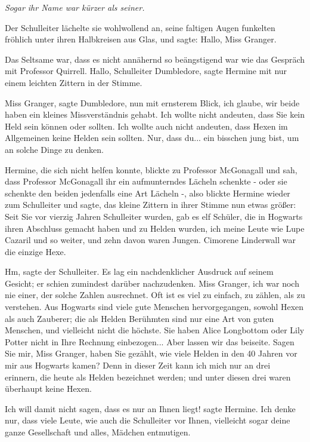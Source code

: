 \emph{Sogar ihr Name war kürzer als seiner. }

Der Schulleiter lächelte sie wohlwollend an, seine faltigen Augen funkelten
fröhlich unter ihren Halbkreisen aus Glas, und sagte: \glqq Hallo, Miss
Granger.\grqq{}

Das Seltsame war, dass es nicht annähernd so beängstigend war wie das Gespräch
mit Professor Quirrell. \glqq Hallo, Schulleiter Dumbledore\grqq{}, sagte
Hermine mit nur einem leichten Zittern in der Stimme.

\glqq Miss Granger\grqq{}, sagte Dumbledore, nun mit ernsterem Blick, \glqq ich
glaube, wir beide haben ein kleines Missverständnis gehabt. Ich wollte nicht
andeuten, dass Sie kein Held sein können oder sollten. Ich wollte auch nicht
andeuten, dass Hexen im Allgemeinen keine Helden sein sollten. Nur, dass du...
ein bisschen jung bist, um an solche Dinge zu denken.\grqq{}

Hermine, die sich nicht helfen konnte, blickte zu Professor McGonagall und sah,
dass Professor McGonagall ihr ein aufmunterndes Lächeln schenkte - oder sie
schenkte den beiden jedenfalls eine Art Lächeln -, also blickte Hermine wieder
zum Schulleiter und sagte, das kleine Zittern in ihrer Stimme nun etwas größer:
\glqq Seit Sie vor vierzig Jahren Schulleiter wurden, gab es elf Schüler, die in
Hogwarts ihren Abschluss gemacht haben und zu Helden wurden, ich meine Leute wie
Lupe Cazaril und so weiter, und zehn davon waren Jungen. Cimorene Linderwall war
die einzige Hexe.\grqq{}

\glqq Hm\grqq{}, sagte der Schulleiter. Es lag ein nachdenklicher Ausdruck auf
seinem Gesicht; er schien zumindest darüber nachzudenken. \glqq Miss Granger,
ich war noch nie einer, der solche Zahlen ausrechnet. Oft ist es viel zu
einfach, zu zählen, als zu verstehen. Aus Hogwarts sind viele gute Menschen
hervorgegangen, sowohl Hexen als auch Zauberer; die als Helden Berühmten sind
nur eine Art von guten Menschen, und vielleicht nicht die höchste. Sie haben
Alice Longbottom oder Lily Potter nicht in Ihre Rechnung einbezogen... Aber
lassen wir das beiseite. Sagen Sie mir, Miss Granger, haben Sie gezählt, wie
viele Helden in den 40 Jahren vor mir aus Hogwarts kamen? Denn in dieser Zeit
kann ich mich nur an drei erinnern, die heute als Helden bezeichnet werden; und
unter diesen drei waren überhaupt keine Hexen.\grqq{}

\glqq Ich will damit nicht sagen, dass es nur an Ihnen liegt!\grqq{} sagte
Hermine. \glqq Ich denke nur, dass viele Leute, wie auch die Schulleiter vor
Ihnen, vielleicht sogar deine ganze Gesellschaft und alles, Mädchen
entmutigen.\grqq{}


